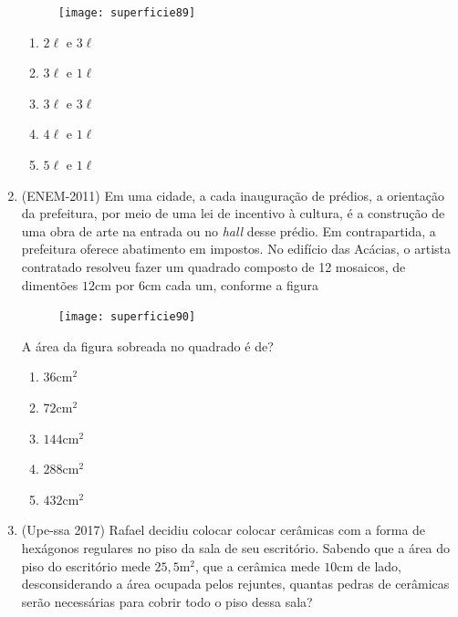 \begin{enumerate}
  \begin{multicols}{2}
  \begin{figure}[H]
    \centering
  
    \texttt{[image: superficie89]}
    \end{figure}
  
    \begin{enumerate}
      \item $2\ell$ e $3\ell$
      \item $3\ell$ e $1\ell$
      \item $3\ell$ e $3\ell$
      \item $4\ell$ e $1\ell$
      \item $5\ell$ e $1\ell$
    \end{enumerate}
  \end{multicols}

  \item (ENEM-2011) Em uma cidade, a cada inauguração de prédios, a orientação da prefeitura, por meio de uma lei de incentivo à cultura, é a construção de uma obra de arte na entrada ou no \textit{hall} desse prédio. Em contrapartida, a prefeitura oferece abatimento em impostos. No edifício das Acácias, o artista contratado resolveu fazer um quadrado composto de 12 mosaicos, de dimentões $12\text{cm}$ por $6$cm cada um, conforme a figura

  \begin{figure}[H]
  \centering

  \texttt{[image: superficie90]}
  \end{figure}

  A área da figura sobreada no quadrado é de?
  \begin{enumerate}
    \item $36$cm$^2$
    \item $72$cm$^2$
    \item $144$cm$^2$
    \item $288$cm$^2$
    \item $432$cm$^2$
  \end{enumerate}

  \item (Upe-ssa 2017) Rafael decidiu colocar colocar cerâmicas com a forma de hexágonos regulares no piso da sala de seu escritório. Sabendo que a área do piso do escritório mede $25{,}5$m$^2$, que a cerâmica mede $10$cm de lado, desconsiderando a área ocupada pelos rejuntes, quantas pedras de cerâmicas serão necessárias para cobrir todo o piso dessa sala?
  \begin{figure}[H]
  \centering


\end{figure}
\end{enumerate}
